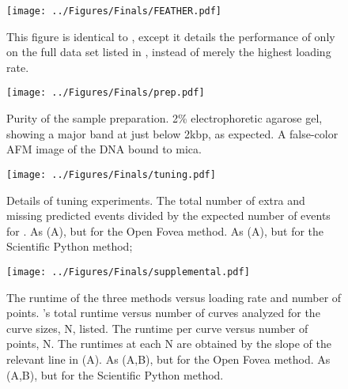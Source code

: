 \begin{figure}[htp]
\caption[Performance of \name{} on larger data set]{\noindent{} This figure is identical to , except it details the performance of only \name{} on the full data set listed in , instead of merely the highest loading rate.   }
\centering
\texttt{[image: ../Figures/Finals/FEATHER.pdf]}%
\end{figure}

\begin{figure}[htp]
\caption[Verification of sample purity]{\noindent{} Purity of the sample preparation.  2\% electrophoretic agarose gel, showing a major band at just below 2kbp, as expected.  A false-color AFM image of the DNA bound to mica.  }
\centering
\texttt{[image: ../Figures/Finals/prep.pdf]}%
\end{figure}


\begin{figure}[htp]
\caption[Cross validation of algorithms and optimal parameters]{\noindent{} Details of tuning experiments.  The total number of extra and missing predicted events divided by the expected number of events for \name{}.  As (A), but for the Open Fovea method.  As (A), but for the Scientific Python method;  }
\centering
\texttt{[image: ../Figures/Finals/tuning.pdf]}%
\end{figure}



\begin{figure}
\caption[Algorithmic runtime versus loading rate]{\noindent{} The runtime of the three methods versus loading rate and number of points.  \name{}'s total runtime versus number of curves analyzed for the curve sizes, N, listed.  The runtime per curve versus number of points, N. The runtimes at each N are obtained by the slope of the relevant line in (A).   As (A,B), but for the Open Fovea method.  As (A,B), but for the Scientific Python method.  }
\centering
\texttt{[image: ../Figures/Finals/supplemental.pdf]}%
\end{figure}





%

%
